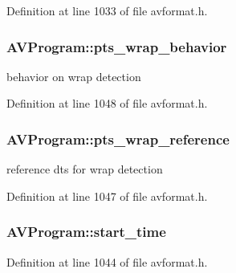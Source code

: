 Definition at line 1033 of file avformat.\+h.

\subsubsection[{\texorpdfstring{pts\+\_\+wrap\+\_\+behavior}{pts_wrap_behavior}}]{ A\+V\+Program\+::pts\+\_\+wrap\+\_\+behavior}\hypertarget{struct_a_v_program_aa3f8af78093a910ff766ac5af381758b}{}\label{struct_a_v_program_aa3f8af78093a910ff766ac5af381758b}


behavior on wrap detection 



Definition at line 1048 of file avformat.\+h.

\subsubsection[{\texorpdfstring{pts\+\_\+wrap\+\_\+reference}{pts_wrap_reference}}]{ A\+V\+Program\+::pts\+\_\+wrap\+\_\+reference}\hypertarget{struct_a_v_program_a7e539e286876577e158039f6e7678452}{}\label{struct_a_v_program_a7e539e286876577e158039f6e7678452}


reference dts for wrap detection 



Definition at line 1047 of file avformat.\+h.

\subsubsection[{\texorpdfstring{start\+\_\+time}{start_time}}]{ A\+V\+Program\+::start\+\_\+time}\hypertarget{struct_a_v_program_a2276db4d51695120664d527f20b7c532}{}\label{struct_a_v_program_a2276db4d51695120664d527f20b7c532}


Definition at line 1044 of file avformat.\+h.

